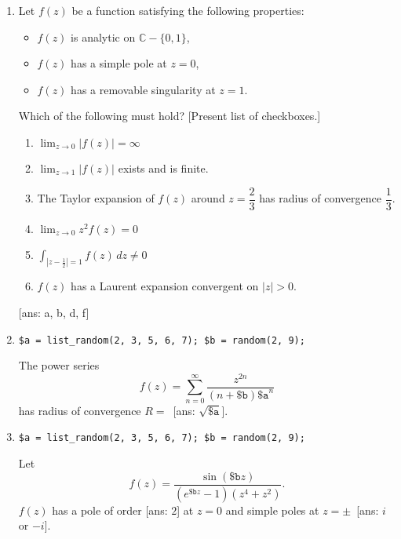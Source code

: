 \documentclass{amsart}
\begin{document}
\begin{enumerate}
    \setlength\itemsep{1em}
    \item Let \(f(z)\) be a function satisfying the following properties:
    
    \bigskip
    \begin{itemize}
        \setlength\itemsep{0.5em}
        \item \(f(z)\) is analytic on \(\mathbb{C}-\{0, 1\}\),
        \item \(f(z)\) has a simple pole at \(z=0\),
        \item \(f(z)\) has a removable singularity at \(z=1\).
    \end{itemize} 
    
    \bigskip
    Which of the following must hold?
    [Present list of checkboxes.]

    \bigskip
    \begin{enumerate}
        \setlength\itemsep{0.5em}
        \item \(\displaystyle \lim_{z\to0}|f(z)|=\infty\)
        \item \(\displaystyle \lim_{z\to1}|f(z)|\) exists and is finite.
        \item The Taylor expansion of \(f(z)\) around \(z=\dfrac23\) has radius of
        convergence \(\dfrac13\).
        \item \(\displaystyle \lim_{z\to0}z^2f(z)=0\)
        \item \(\int_{|z-\frac12|=1} f(z)\,dz \neq 0\)
        \item $f(z)$ has a Laurent expansion convergent on $|z|>0$.
    \end{enumerate}

    [ans: a, b, d, f]

    \item \texttt{\$a = list\_random(2, 3, 5, 6, 7); \$b = random(2, 9);}
    
    \bigskip\noindent
    The power series
    \[
        f(z) = \sum_{n=0}^\infty \frac{z^{2n}}{(n+\texttt{\$b})\texttt{\$a}^n}
    \]
    has radius of convergence \(R=\,\)\fbox{$\phantom{A}\qquad\qquad$} [ans: $\sqrt{\texttt{\$a}}$].

    \item \texttt{\$a = list\_random(2, 3, 5, 6, 7); \$b = random(2, 9);}
    
    \bigskip\noindent
    Let
    \[
        f(z) = \frac{\sin(\texttt{\$b}z)}{(e^{\texttt{\$b} z}-1)(z^4 + z^2)}.
    \]
    \(f(z)\) has a pole of order \fbox{$\phantom{A}\qquad\qquad$} [ans: $2$] at $z=0$ and simple poles at \(z= \pm\,\) \fbox{$\phantom{A}\qquad\qquad$} [ans: $i$ or $-i$].


\end{enumerate}
\end{document}
